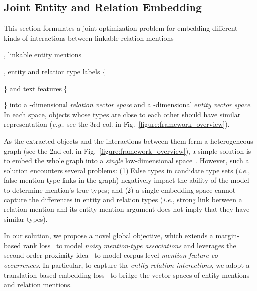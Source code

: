 \documentclass[letterpaper]{sig-alternate-2013}
\def\ie{{\sl i.e.}}
\def\eg{{\sl e.g.}}
\begin{document}
\subsection{Joint Entity and Relation Embedding}
\label{subsec:model}
This section formulates a joint optimization problem for embedding different kinds of interactions between linkable relation mentions \begin{small}\end{small}, linkable entity mentions \begin{small}\end{small}, entity and relation type labels \{\begin{small}\end{small}\} and text features \{\begin{small}\end{small}\} into a -dimensional \textit{relation vector space} and a -dimensional \textit{entity vector space}. In each space, objects whose types are close to each other should have similar representation (\eg, see the 3rd col. in Fig.~\ref{figure:framework_overview}).

As the extracted objects and the interactions between them form a heterogeneous graph (see the 2nd col. in Fig.~\ref{figure:framework_overview}), a simple solution is to embed the whole graph into a \textit{single} low-dimensional space~\cite{he2004locality,ren2015clustype}. However, such a solution encounters several problems: (1) False types in candidate type sets (\ie, false mention-type links in the graph) negatively impact the ability of the model to determine mention's true types; and (2) a single embedding space cannot capture the differences in entity and relation types (\ie, strong link between a relation mention and its entity mention argument does not imply that they have similar types).

In our solution, we propose a novel global objective, which extends a margin-based rank loss~\cite{nguyen2008classification} to model \textit{noisy mention-type associations} and leverages the second-order proximity idea~\cite{tang2015line} to model corpus-level \textit{mention-feature co-occurrences}. In particular, to capture the \textit{entity-relation interactions}, we adopt a translation-based embedding loss~\cite{bordes2013translating} to bridge the vector spaces of entity mentions and relation mentions.
\end{document}
